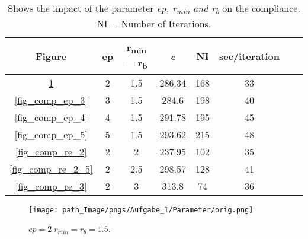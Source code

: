 \begin{table}[!h]
\centering
\begin{tabular}{|c|c|c|c|c|c|c|c|}
\hline 
Figure & ep & r\textsubscript{min} = r\textsubscript{b} &
\emph{c} &NI & sec/iteration  \\ 
\hline 
\ref{fig_comp_orig} & 2 & 1.5  & 286.34 & 168 & 33 \\ 
\hline 
\ref{fig_comp_ep_3} & 3 & 1.5 & 284.6 & 198 & 40 \\ 
\hline 
\ref{fig_comp_ep_4} & 4 & 1.5  & 291.78 & 195 & 45 \\ 
\hline 
\ref{fig_comp_ep_5} & 5 & 1.5  & 293.62 & 215 & 48 \\ 
\hline 
\ref{fig_comp_re_2} & 2 & 2  & 237.95 & 102 & 35 \\ 
\hline 
\ref{fig_comp_re_2_5} & 2 & 2.5  & 298.57 & 128 & 41 \\ 
\hline 
\ref{fig_comp_re_3} & 2 & 3  & 313.8 & 74 & 36 \\ 
\hline 
\end{tabular} 
\caption{Shows the impact of the parameter \emph{ep, r\textsubscript{min}
and r\textsubscript{b}}
on the compliance.\\
NI = Number of Iterations.}
\label{tabel_compare_parameters}
\end{table}

\begin{figure}[!h]
\centering
  \texttt{[image: path\_Image/pngs/Aufgabe\_1/Parameter/orig.png]}
	\caption{$ep = 2\; r_{min} = r_{b}=1.5$.} 
	\label{fig_comp_orig}
\end{figure}


